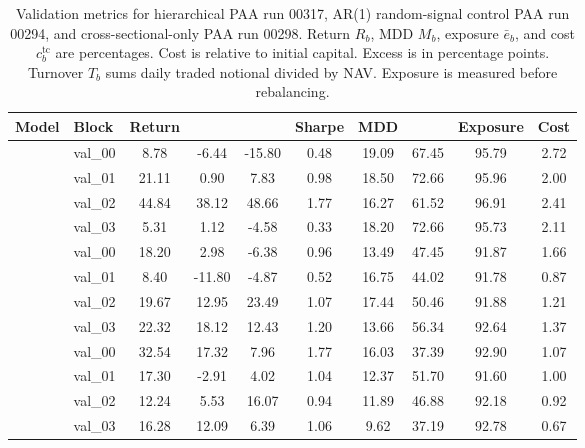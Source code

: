 \begin{table}[p]
\centering
\footnotesize
\setlength{\tabcolsep}{3.5pt}
\begin{tabular}{@{}llS[table-format=2.2]S[table-format=-2.2]S[table-format=-2.2]S[table-format=1.2]S[table-format=2.2]S[table-format=2.2]S[table-format=2.2]S[table-format=1.2]@{}}
\toprule
{Model} & {Block} & {Return} & {} & {} & {Sharpe} & {MDD} & {} & {Exposure} & {Cost} \\
\midrule
{} & val\_00 & 8.78 & -6.44 & -15.80 & 0.48 & 19.09 & 67.45 & 95.79 & 2.72 \\
 & val\_01 & 21.11 & 0.90 & 7.83 & 0.98 & 18.50 & 72.66 & 95.96 & 2.00 \\
 & val\_02 & 44.84 & 38.12 & 48.66 & 1.77 & 16.27 & 61.52 & 96.91 & 2.41 \\
 & val\_03 & 5.31 & 1.12 & -4.58 & 0.33 & 18.20 & 72.66 & 95.73 & 2.11 \\
\midrule
{} & val\_00 & 18.20 & 2.98 & -6.38 & 0.96 & 13.49 & 47.45 & 91.87 & 1.66 \\
 & val\_01 & 8.40 & -11.80 & -4.87 & 0.52 & 16.75 & 44.02 & 91.78 & 0.87 \\
 & val\_02 & 19.67 & 12.95 & 23.49 & 1.07 & 17.44 & 50.46 & 91.88 & 1.21 \\
 & val\_03 & 22.32 & 18.12 & 12.43 & 1.20 & 13.66 & 56.34 & 92.64 & 1.37 \\
\midrule
{} & val\_00 & 32.54 & 17.32 & 7.96 & 1.77 & 16.03 & 37.39 & 92.90 & 1.07 \\
 & val\_01 & 17.30 & -2.91 & 4.02 & 1.04 & 12.37 & 51.70 & 91.60 & 1.00 \\
 & val\_02 & 12.24 & 5.53 & 16.07 & 0.94 & 11.89 & 46.88 & 92.18 & 0.92 \\
 & val\_03 & 16.28 & 12.09 & 6.39 & 1.06 & 9.62 & 37.19 & 92.78 & 0.67 \\
\bottomrule
\end{tabular}
\caption{Validation metrics for hierarchical PAA run 00317, AR(1) random-signal control PAA run 00294, and cross-sectional-only PAA run 00298. Return \(R_b\), MDD \(M_b\), exposure \(\bar e_b\), and cost \(c_b^{\mathrm{tc}}\) are percentages. Cost is relative to initial capital. Excess is in percentage points. Turnover \(T_b\) sums daily traded notional divided by NAV. Exposure is measured before rebalancing.}
\label{tab:paa-validation-blocks}
\end{table}

